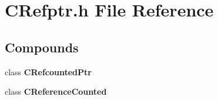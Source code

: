 \section{CRefptr.h File Reference}
\label{CRefptr_8h}
\subsection*{Compounds}
\begin{CompactItemize}
\item 
class {\bf CRefcounted\-Ptr}
\item 
class {\bf CReference\-Counted}
\end{CompactItemize}
